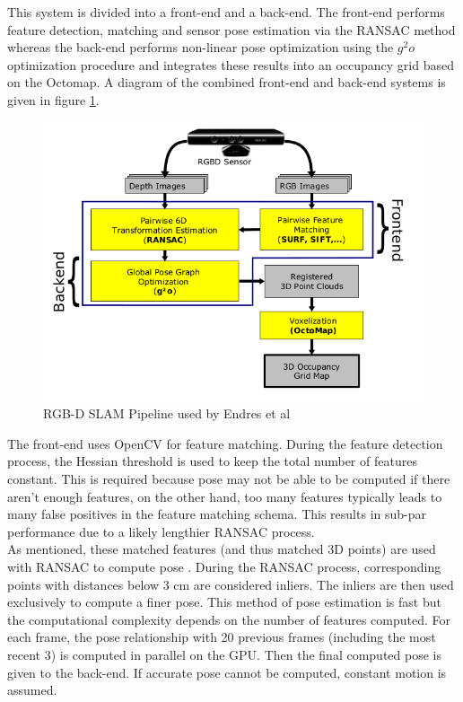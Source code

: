This system is divided into a front-end and a back-end. The front-end performs feature detection, matching and sensor pose estimation via the RANSAC method whereas the back-end performs non-linear pose optimization using the $g^2o$ optimization procedure and integrates these results into an occupancy grid based on the Octomap. A diagram of the combined front-end and back-end systems is given in figure \ref{Endres12EvaluationPipeline}. 


\begin{figure}[!htb]
\centering
\includegraphics[width=12cm]{images/ch1/Endres12EvaluationPipeline}
\caption{RGB-D SLAM Pipeline used by Endres et al \cite{Endres12Evaluation}}
\label{Endres12EvaluationPipeline}
\end{figure}


The front-end uses OpenCV \cite{Bradski08Learning} for feature matching. During the feature detection process, the Hessian threshold is used to keep the total number of features constant. This is required because pose may not be able to be computed if there aren't enough features, on the other hand, too many features typically leads to many false positives in the feature matching schema. This results in sub-par performance due to a likely lengthier RANSAC process. \\

As mentioned, these matched features (and thus matched 3D points) are used with RANSAC to compute pose \cite{Umeyama91Least}. During the RANSAC process, corresponding points with distances below 3 cm are considered inliers. The inliers are then used exclusively to compute a finer pose. This method of pose estimation is fast but the computational complexity depends on the number of features computed. For each frame, the pose relationship with 20 previous frames (including the most recent 3) is computed in parallel on the GPU. Then the final computed pose is given to the back-end. If accurate pose cannot be computed, constant motion is assumed. \\

